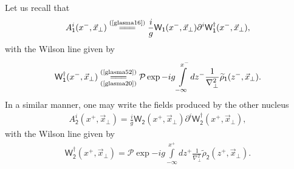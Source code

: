 \begin{note}
Let us recall that
\begin{align*}
    A^i_\textsf{1}(x^-,\vec{x}_\perp)\stackrel{(\text{\cref{glasma16}})}{=\joinrel=\joinrel=}\frac{i}{g}\textsf{W}_\textsf{1}(x^-,\vec{x}_\perp)\partial^i\textsf{W}_\textsf{1}^\dag(x^-,\vec{x}_\perp),
\end{align*}
with the Wilson line given by
\begin{align*}
    \textsf{W}_\textsf{1}^\dag(x^-,\vec{x}_\perp)\underset{(\text{\cref{glasma20}})}{\stackrel{(\text{\cref{glasma52}})}{=\joinrel=\joinrel=}}\mathcal{P}\exp{-ig\int\limits_{-\infty}^{x^-}dz^-\frac{1}{\nabla_\perp^2}\widetilde{\rho}_\textsf{1}(z^-,\vec{x}_\perp)}.
\end{align*}
In a similar manner, one may write the fields produced by the other nucleus
\begin{align*}
    A^i_\textsf{2}(x^+,\vec{x}_\perp)=\frac{i}{g}\textsf{W}_\textsf{2}(x^+,\vec{x}_\perp)\partial^i\textsf{W}_\textsf{2}^\dag(x^+,\vec{x}_\perp),
\end{align*}
with the Wilson line given by
\begin{align*}
    \textsf{W}_\textsf{2}^\dag(x^+,\vec{x}_\perp)=\mathcal{P}\exp{-ig\int\limits_{-\infty}^{x^+}dz^+\frac{1}{\nabla_\perp^2}\widetilde{\rho}_\textsf{2}(z^+,\vec{x}_\perp)}.
\end{align*}
\end{note}


